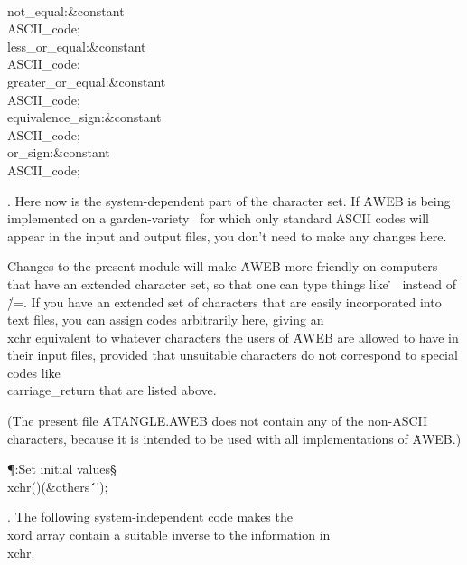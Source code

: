 \\{not\_equal}\?:\?\&{constant}\8\\{ASCII\_code}\?\K{}\?;\6
\\{less\_or\_equal}\?:\?\&{constant}\8\\{ASCII\_code}\?\K{}\?;%
\6
\\{greater\_or\_equal}\?:\?\&{constant}\8\\{ASCII\_code}\?\K{}\?;%
\6
\\{equivalence\_sign}\?:\?\&{constant}\8\\{ASCII\_code}\?\K{}\?;%
\6
\\{or\_sign}\?:\?\&{constant}\8\\{ASCII\_code}\?\K{}\?;\par
\fi

. Here now is the system-dependent part of the character set.
If \.{AWEB} is being implemented on a garden-variety \ADA\ for which
only standard ASCII codes will appear in the input and output files, you
don't need to make any changes here.

Changes to the present module will make \.{AWEB} more friendly on computers
that have an extended character set, so that one can type things like
\.^^Z\ instead of \.{/=}. If you have an extended set of characters that
are easily incorporated into text files, you can assign codes arbitrarily
here, giving an \\{xchr} equivalent to whatever characters the users of
\.{AWEB} are allowed to have in their input files, provided that unsuitable
characters do not correspond to special codes like \\{carriage\_return}
that are listed above.

(The present file \.{ATANGLE.AWEB} does not contain any of the non-ASCII
characters, because it is intended to be used with all implementations of
\.{AWEB}.)

\Y\P\?\4:Set initial values\X\mathrel{+}\S\?\6
\\{xchr}\?\1(\?\to{}\2)\K\1(\?\&{others}\?\8\KR\?\.{\'\ \'}\?\2)\?;%
\par
\fi

. The following system-independent code makes the \\{xord} array contain a
suitable inverse to the information in \\{xchr}.

